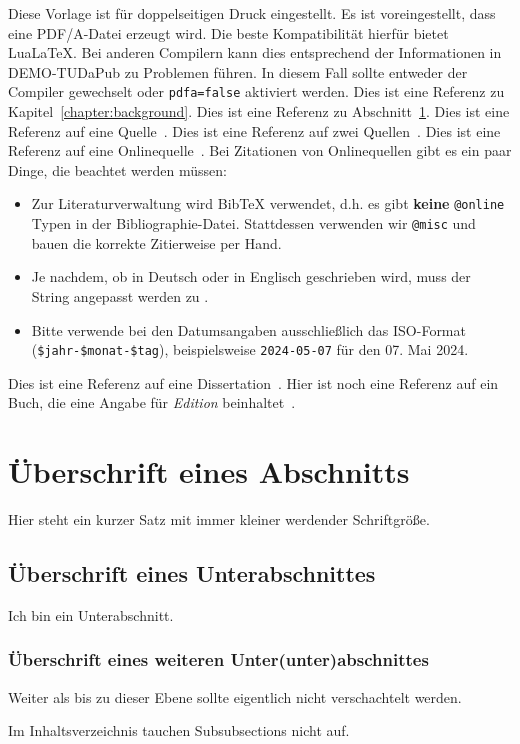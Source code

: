 Diese Vorlage ist für doppelseitigen Druck eingestellt.
Es ist voreingestellt, dass eine PDF/A-Datei erzeugt wird.
Die beste Kompatibilität hierfür bietet Lua\LaTeX.
Bei anderen Compilern kann dies entsprechend der Informationen in DEMO-TUDaPub zu Problemen führen.
In diesem Fall sollte entweder der Compiler gewechselt oder \texttt{pdfa=false} aktiviert werden.
Dies ist eine Referenz zu Kapitel~\ref{chapter:background}.
Dies ist eine Referenz zu Abschnitt~\ref{sect:dummy-section}.
Dies ist eine Referenz auf eine Quelle~\cite{Luthmann2017}.
Dies ist eine Referenz auf zwei Quellen~\cite{Luthmann2019,Ruland2018}.
Dies ist eine Referenz auf eine Onlinequelle~\cite{parallel-computing}.
Bei Zitationen von Onlinequellen gibt es ein paar Dinge, die beachtet werden müssen:
\begin{itemize}
	\item Zur Literaturverwaltung wird BibTeX verwendet, d.h. es gibt \textbf{keine} \texttt{@online} Typen in der Bibliographie-Datei. Stattdessen verwenden wir \texttt{@misc} und bauen die korrekte Zitierweise per Hand.
	\item Je nachdem, ob in Deutsch oder in Englisch geschrieben wird, muss der String  angepasst werden zu .
	\item Bitte verwende bei den Datumsangaben ausschließlich das ISO-Format (\texttt{\$jahr-\$monat-\$tag}), beispielsweise \texttt{2024-05-07} für den 07. Mai 2024.
\end{itemize}
Dies ist eine Referenz auf eine Dissertation~\cite{tomaszek_stefan_modellbasierte_2021}.
Hier ist noch eine Referenz auf ein Buch, die eine Angabe für \textit{Edition} beinhaltet~\cite{gtTaentzer}.



\section{Überschrift eines Abschnitts}\label{sect:dummy-section}


{\Huge Hier} {\huge steht} {\LARGE ein} {\Large kurzer} {\large Satz} {\normalsize mit} {\small immer} {\footnotesize kleiner} {\scriptsize werdender} {\tiny Schriftgröße}.

\subsection{Überschrift eines Unterabschnittes}\label{subsec:dummy-sub-section}

Ich bin ein Unterabschnitt.

\subsubsection{Überschrift eines weiteren Unter(unter)abschnittes}\label{subsubsec:dummy-sub-sub-section}

Weiter als bis zu dieser Ebene sollte eigentlich nicht verschachtelt werden.

Im Inhaltsverzeichnis tauchen Subsubsections nicht auf.

